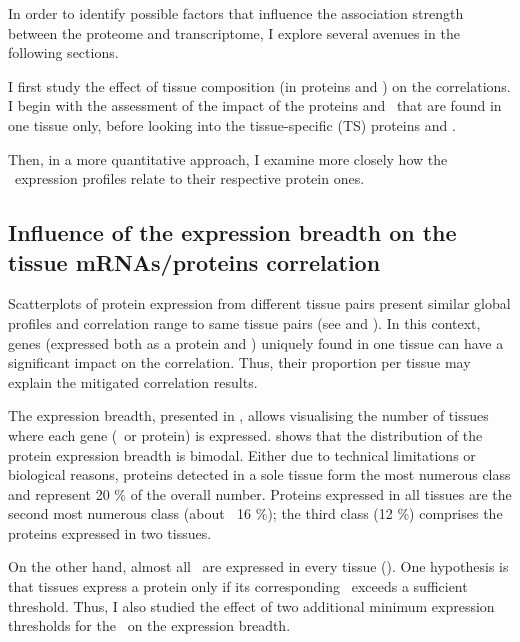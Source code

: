 In order to identify possible factors
that influence the association strength
between the proteome and transcriptome,
I explore several avenues in the following sections.

I first study the effect of tissue composition (in proteins and \mRNAs)
on the correlations.
I begin with the assessment of the impact of the proteins and \mRNAs\
that are found in one tissue only,
before looking into the tissue-specific (\gls{TS}) proteins and \mRNAs{}.

Then, in a more quantitative approach,
I examine more closely how the \mRNA\ expression profiles relate
to their respective protein ones.

\subsection{Influence of the expression breadth on the tissue %
\texorpdfstring{\MakeLowercase{m}RNAs/proteins}{mRNAs/proteins} correlation}

Scatterplots of protein expression from different tissue pairs present
similar global profiles and correlation range to same tissue pairs
(see \Cref{ch:proteomics} and ).
In this context,
genes (expressed both as a protein and \mRNA)
uniquely found in one tissue can have a significant impact on the correlation.
Thus, their proportion per tissue may explain
the mitigated correlation results.%

The expression breadth, presented in ,
allows visualising the number of tissues
where each gene (\mRNA\ or protein) is expressed.
 shows that
the distribution of the protein expression breadth is bimodal.
Either due to technical limitations or biological reasons,
proteins detected in a sole tissue form
the most numerous class and represent 20 \% of the overall number.
Proteins expressed in all tissues are the second most numerous class (about $~$ 16 \%);
the third class (12 \%) comprises the proteins expressed in two tissues.

On the other hand,
almost all \mRNAs\ are expressed in every tissue ().
One hypothesis is that tissues express a protein only
if its corresponding \mRNA\ exceeds a sufficient threshold.
Thus, I also studied the effect of
two additional minimum expression thresholds for the \mRNAs\
on the expression breadth.\mybr\

